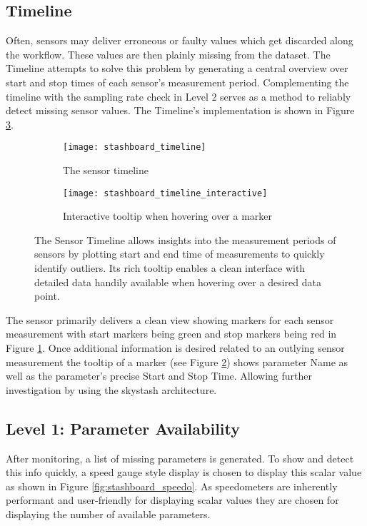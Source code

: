 \subsection{Timeline}

Often, sensors may deliver erroneous or faulty values which get discarded along the workflow. These values are then plainly missing from the dataset. The Timeline attempts to solve this problem by generating a central overview over start and stop times of each sensor's measurement period. Complementing the timeline with the sampling rate check in Level 2 serves as a method to reliably detect missing sensor values. The Timeline's implementation is shown in Figure \ref{fig:stashboard_timeline}.

\begin{figure}[!h]
    \centering
    \begin{subfigure}[b]{1\textwidth}
        \texttt{[image: stashboard\_timeline]}
        \caption{The sensor timeline}
        \label{fig:stashboard_timeline_clean}
    \end{subfigure}
    \begin{subfigure}[b]{1\textwidth}
        \texttt{[image: stashboard\_timeline\_interactive]}
        \caption{Interactive tooltip when hovering over a marker}
        \label{fig:stashboard_timeline_interactive}
    \end{subfigure}
    \caption[Stashboard: Sensor Timeline]{The Sensor Timeline allows insights into the measurement periods of sensors by plotting start and end time of measurements to quickly identify outliers. Its rich tooltip enables a clean interface with detailed data handily available when hovering over a desired data point.}
    \label{fig:stashboard_timeline}
\end{figure}

The sensor primarily delivers a clean view showing markers for each sensor measurement with start markers being green and stop markers being red in Figure \ref{fig:stashboard_timeline_clean}. Once additional information is desired related to an outlying sensor measurement the tooltip of a marker (see Figure \ref{fig:stashboard_timeline_interactive}) shows parameter Name as well as the parameter's precise Start and Stop Time. Allowing further investigation by using the skystash architecture.

\subsection{Level 1: Parameter Availability}
After monitoring, a list of missing parameters is generated. To show and detect this info quickly, a speed gauge style display is chosen to display this scalar value as shown in Figure \ref{fig:stashboard_speedo}. As speedometers are inherently performant and user-friendly for displaying scalar values they are chosen for displaying the number of available parameters.

